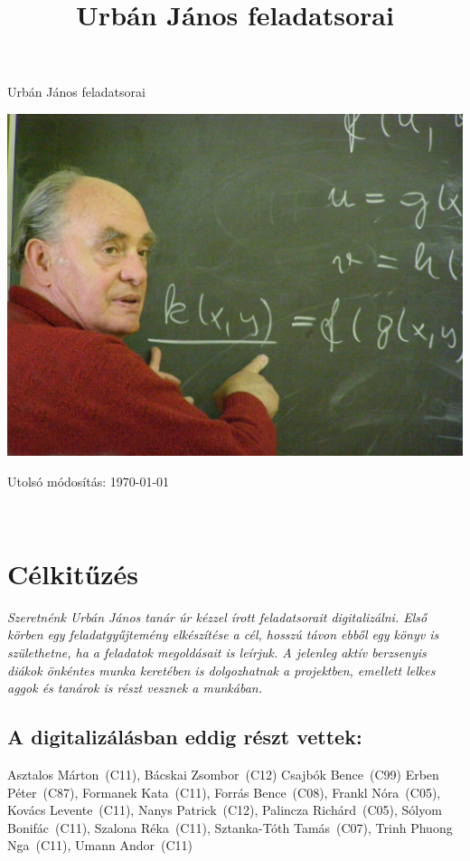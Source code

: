 \documentclass[twoside]{book}
\title{Urbán János feladatsorai}
\begin{document}
\frontmatter
\begin{titlepage}

\hfill {\fontsize{42}{50}\selectfont Urbán János feladatsorai}

\vskip 2cm

\centerline{
\includegraphics[scale=0.2]{uj70.jpg}
}

\vfill

\hfill{\small Utolsó módosítás: \today }
\end{titlepage}

\newpage
~
\newpage

\section*{Célkitűzés}

\textit{Szeretnénk Urbán János tanár úr kézzel írott feladatsorait digitalizálni. Első körben egy feladatgyűjtemény elkészítése a cél, hosszú távon ebből egy könyv is születhetne, ha a feladatok megoldásait is leírjuk. A jelenleg aktív berzsenyis diákok önkéntes munka keretében is dolgozhatnak a projektben, emellett lelkes aggok és tanárok is részt vesznek a munkában.}

\subsection*{A digitalizálásban eddig részt vettek:}  
Asztalos Márton~(C11),
Bácskai Zsombor~(C12)
Csajbók Bence~(C99)
 Erben Péter~(C87),
 Formanek Kata~(C11),
 Forrás Bence~(C08),
 Frankl Nóra~(C05),
 Kovács Levente~(C11),
 Nanys Patrick~(C12),
 Palincza Richárd~(C05),
 Sólyom Bonifác~(C11),
 Szalona Réka~(C11),
 Sztanka-Tóth Tamás~(C07),
 Trinh Phuong Nga~(C11),
 Umann Andor~(C11)
\end{document}
